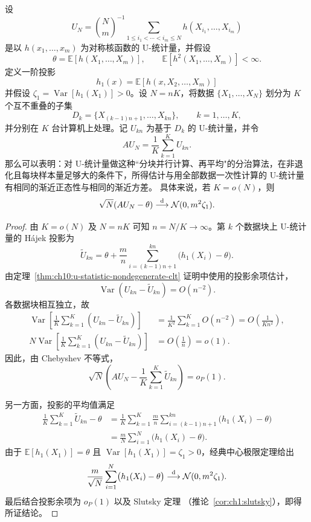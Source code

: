 \begin{example}\label{ex:ch10:divide-conquer-u-statistic}
设
\[
U_N=\binom Nm^{-1}\sum_{1\leq i_1<\cdots<i_m\leq N}
h(X_{i_1},\ldots,X_{i_m})
\]
是以 $h(x_1,\ldots,x_m)$ 为对称核函数的 U-统计量，并假设
\[
\theta=\mathbb E[h(X_1,\ldots,X_m)],\qquad
\mathbb E[h^2(X_1,\ldots,X_m)]<\infty.
\]
定义一阶投影
\[
h_1(x)=\mathbb E[h(x,X_2,\ldots,X_m)]
\]
并假设 $\zeta_1=\operatorname{Var}[h_1(X_1)]>0$。设 $N=nK$，将数据
$\{X_1,\ldots,X_N\}$ 划分为 $K$ 个互不重叠的子集
\[
D_k=\{X_{(k-1)n+1},\ldots,X_{kn}\},\qquad k=1,\ldots,K,
\]
并分别在 $K$ 台计算机上处理。记 $U_{kn}$ 为基于 $D_k$ 的 U-统计量，并令
\[
AU_N=\frac1K\sum_{k=1}^K U_{kn}.
\]
那么可以表明：对 U-统计量做这种``分块并行计算、再平均"的分治算法，在非退化且每块样本量足够大的条件下，所得估计与用全部数据一次性计算的 U-统计量有相同的渐近正态性与相同的渐近方差。
具体来说，若 $K=o(N)$，则
\[
\sqrt N(AU_N-\theta)\overset{\rm d}\longrightarrow
\mathcal N(0,m^2\zeta_1).
\]

\begin{proof}
由 $K=o(N)$ 及 $N=nK$ 可知 $n=N/K\to\infty$。第 $k$ 个数据块上
U-统计量的 H\'ajek 投影为
\[
\widetilde U_{kn}
=\theta+\frac mn\sum_{i=(k-1)n+1}^{kn}\bigl(h_1(X_i)-\theta\bigr).
\]
由定理~\ref{thm:ch10:u-statistic-nondegenerate-clt} 证明中使用的投影余项估计，
\[
\operatorname{Var}(U_{kn}-\widetilde U_{kn})=O(n^{-2}).
\]
各数据块相互独立，故
\[
\begin{aligned}
\operatorname{Var}\left[
  \frac1K\sum_{k=1}^K(U_{kn}-\widetilde U_{kn})
\right]
&=\frac1{K^2}\sum_{k=1}^K O(n^{-2})
=O\left(\frac1{Kn^2}\right),\\
N\operatorname{Var}\left[
  \frac1K\sum_{k=1}^K(U_{kn}-\widetilde U_{kn})
\right]
&=O\left(\frac1n\right)=o(1).
\end{aligned}
\]
因此，由 Chebyshev 不等式，
\[
\sqrt N\left(
AU_N-\frac1K\sum_{k=1}^K\widetilde U_{kn}
\right)=o_P(1).
\]

另一方面，投影的平均值满足
\[
\begin{aligned}
\frac1K\sum_{k=1}^K\widetilde U_{kn}-\theta
&=\frac1K\sum_{k=1}^K\frac mn
  \sum_{i=(k-1)n+1}^{kn}\bigl(h_1(X_i)-\theta\bigr)\\
&=\frac mN\sum_{i=1}^N\bigl(h_1(X_i)-\theta\bigr).
\end{aligned}
\]
由于 $\mathbb E[h_1(X_1)]=\theta$ 且
$\operatorname{Var}[h_1(X_1)]=\zeta_1>0$，经典中心极限定理给出
\[
\frac m{\sqrt N}\sum_{i=1}^N\bigl(h_1(X_i)-\theta\bigr)
\overset{\rm d}\longrightarrow \mathcal N(0,m^2\zeta_1).
\]
最后结合投影余项为 $o_P(1)$ 以及 Slutsky 定理
（推论~\ref{cor:ch1:slutsky}），即得所证结论。
\end{proof}
\end{example}
